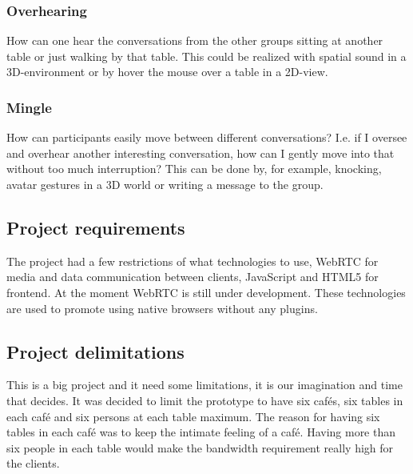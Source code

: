 \documentclass[12pt, titlepage]{article}
\begin{document}
\subsubsection{Overhearing}
How can one hear the conversations from the other groups sitting at another table or just walking by that table. This could be realized with spatial sound in a 3D-environment or by hover the mouse over a table in a 2D-view.
\subsubsection{Mingle}
How can participants easily move between different conversations? I.e. if I oversee and overhear another interesting conversation, how can I gently move into that without too much interruption? This can be done by, for example, knocking, avatar gestures in a 3D world or writing a message to the group.

\subsection{Project requirements}
The project had a few restrictions of what technologies to use, WebRTC for media and data communication between clients, JavaScript and HTML5 for frontend. At the moment WebRTC is still under development. These technologies are used to promote using native browsers without any plugins.
\subsection{Project delimitations}
This is a big project and it need some limitations, it is our imagination and time that decides. It was decided to limit the prototype to have six cafés, six tables in each café and six persons at each table maximum. The reason for having six tables in each café was to keep the intimate feeling of a café. Having more than six people in each table would make the bandwidth requirement really high for the clients.
\end{document}
